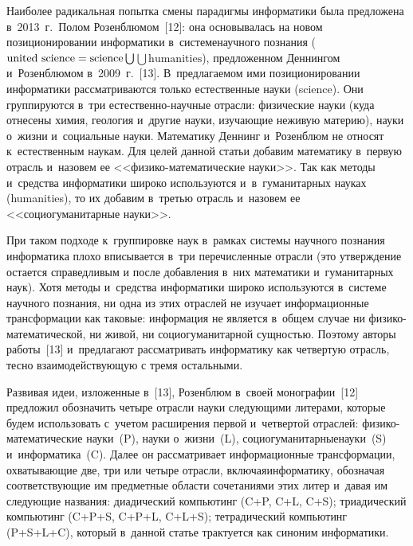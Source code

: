 {\begin{multicols}{2}
  Наиболее радикальная попытка смены парадигмы информатики была 
предложена в~2013~г.\ Полом Розенблюмом~[12]: она основывалась на 
новом позиционировании информатики в~сис\-те\-ме\linebreak научного познания ($\mathrm{united}\ 
\mathrm{science}\hm=\mathrm{science}\bigcup$\linebreak $\bigcup \mathrm{humanities}$), предложенном Деннингом 
и~Розенблюмом в~2009~г.~[13]. В~пред\-ла\-га\-емом ими позиционировании 
информатики рассматриваются только естественные науки (science). Они 
группируются в~три ес\-тест\-вен\-но-на\-уч\-ные отрасли: физические науки (куда 
отнесены химия, геология и~другие науки, изучающие неживую материю), 
науки о~жизни и~социальные науки. Математику Деннинг и~Розенблюм не 
относят к~естественным наукам. Для целей данной \mbox{статьи} добавим математику 
в~первую отрасль и~назовем ее <<фи\-зи\-ко-ма\-те\-ма\-ти\-че\-ские науки>>. Так 
как методы и~средства информатики широко используются 
и~в~гуманитарных науках (humanities), то их добавим в~третью отрасль 
и~назовем ее <<со\-цио\-гу\-ма\-ни\-тар\-ные науки>>.
  
  При таком подходе к~группировке наук в~рамках сис\-те\-мы научного 
познания информатика плохо вписывается в~три пе\-ре\-чис\-лен\-ные отрасли (это 
утверждение остается справедливым и после до\-бав\-ле\-ния в~них математики 
и~гуманитарных наук). Хотя методы и~средства информатики широко 
используются в~сис\-те\-ме научного познания, ни одна из этих отраслей не 
изучает информационные трансформации как таковые: информация не 
является в~общем случае ни фи\-зи\-ко-ма\-те\-ма\-ти\-че\-ской, ни живой, ни  
со\-цио\-гу\-ма\-ни\-тар\-ной сущ\-ностью. Поэтому авторы работы~[13] и~предлагают 
рас\-смат\-ри\-вать информатику как четвертую отрасль, тесно 
взаи\-мо\-дей\-ст\-ву\-ющую с тремя остальными.
  
  Развивая идеи, изложенные в~[13], Розенблюм в~своей монографии~[12] 
предложил обозначить четыре отрасли науки сле\-ду\-ющи\-ми литерами, 
которые будем использовать с~учетом расширения первой и~четвертой 
отраслей: фи\-зи\-ко-ма\-те\-ма\-ти\-че\-ские науки~(P), науки о~жизни~(L),  
со\-цио\-гу\-ма\-ни\-тар\-ные\linebreak науки~(S) и~информатика~(C). Далее он рас\-смат\-ри\-ва\-ет 
информационные трансформации, охва\-ты\-ва\-ющие две, три или четыре 
отрасли, включая\linebreak информатику, обозначая со\-от\-вет\-ст\-ву\-ющие им пред\-мет\-ные 
области сочетаниями этих литер и~давая им сле\-ду\-ющие названия: 
диа\-ди\-че\-ский ком\-пью\-тинг (C\;+\;P, C\;+\;L, C\;+\;S); триадический 
ком\-пью\-тинг (C\;+\;P\;+\;S, C\;+\;P\;+\;L, C\;+\;L\;+\;S);\linebreak 
тет\-ра\-ди\-че\-ский 
компьютинг (P\;+\;S\;+\;L\;+\;C), который в~данной статье трактуется как 
синоним ин\-фор\-ма\-тики.
  

\end{multicols}}
